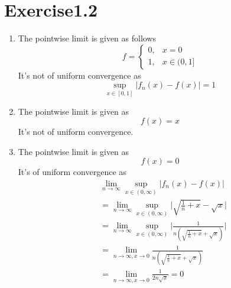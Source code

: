 \documentclass[paper=a4, fontsize=11pt]{scrartcl} %
\numberwithin{equation}{section} %
\numberwithin{figure}{section} %
\numberwithin{table}{section} %
\begin{document}
\section{Exercise1.2}
\begin{enumerate}
	\item
		The pointwise limit is given as follows
		\begin{equation}
			f = \left\{\begin{aligned}
			0, & x = 0\\
			1, & x\in(0,1]
			\end{aligned}
			\right.
		\end{equation}
		It's not of uniform convergence as
		\begin{equation}
			\sup_{x\in[0, 1]} |f_n(x) - f(x)| = 1
		\end{equation}
	\item 
		The pointwise limit is given as
		\begin{equation}
			f(x) = x
		\end{equation}
		It's not of uniform convergence.
	\item 
		The pointwise limit is given as
		\begin{equation}
			f(x) = 0
		\end{equation}
		It's of uniform convergence as
		\begin{equation}
			\begin{aligned}
				&	\lim\limits_{n\rightarrow\infty}\sup_{x\in(0, \infty)}|f_n(x) - f(x)|\\
				& =\lim\limits_{n\rightarrow\infty}\sup_{x\in(0, \infty)}\Biggl|\sqrt{\frac{1}{n} + x} - \sqrt{x}\Biggr|\\
				& =\lim\limits_{n\rightarrow\infty}\sup_{x\in(0, \infty)}\Biggl|\frac{1}{n(\sqrt{\frac{1}{n} + x} + \sqrt{x})}\Biggr|\\
				& = \lim\limits_{n\rightarrow\infty, x \rightarrow 0}\frac{1}{n(\sqrt{\frac{1}{n} + x} + \sqrt{x})}\\
				& = \lim\limits_{n\rightarrow\infty, x \rightarrow 0}\frac{1}{2n\sqrt{x}} = 0
			\end{aligned}
		\end{equation}
\end{enumerate}
\end{document}
